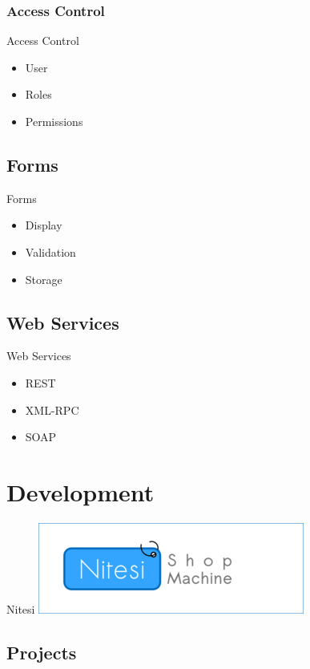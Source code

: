 \subsubsection{Access Control}
\begin{frame}{Access Control}
\begin{itemize}
\item User
\item Roles
\item Permissions
\end{itemize}
\end{frame}

\subsection{Forms}
\begin{frame}{Forms}
\begin{itemize}
\item Display
\item Validation
\item Storage
\end{itemize}
\end{frame}

\subsection{Web Services}
\begin{frame}{Web Services}
\begin{itemize}
\item REST
\item XML-RPC
\item SOAP
\end{itemize}
\end{frame}

\section{Development}

\begin{frame}{Nitesi}
  \includegraphics{nitesi.png}
\end{frame}

\subsection{Projects}
